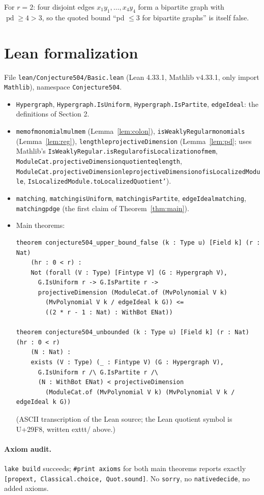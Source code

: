 \documentclass[11pt]{article}
\theoremstyle{definition}
\theoremstyle{remark}
\renewcommand{\_}{\oldus\allowbreak}
\newcommand{\pd}{\operatorname{pd}}
\begin{document}
For $r=2$: four disjoint edges $x_1y_1,\dots,x_4y_4$ form a bipartite graph with $\pd\ge 4>3$, so
the quoted bound ``pd $\le 3$ for bipartite graphs'' is itself false.

\section{Lean formalization}

File \texttt{lean/Conjecture504/Basic.lean} (Lean 4.33.1, Mathlib v4.33.1, only import
\texttt{Mathlib}), namespace \texttt{Conjecture504}.
\begin{itemize}[nosep]
\item \texttt{Hypergraph}, \texttt{Hypergraph.IsUniform}, \texttt{Hypergraph.IsPartite},
  \texttt{edgeIdeal}: the definitions of Section 2.
\item \texttt{mem\_of\_monomial\_mul\_mem} (Lemma~\ref{lem:colon}),
  \texttt{isWeaklyRegular\_monomials} (Lemma~\ref{lem:reg}),
  \texttt{length\_le\_projectiveDimension} (Lemma~\ref{lem:pd}; uses Mathlib's
  \texttt{IsWeaklyRegular.isRegular\_of\_isLocalization\_of\_mem},
  \texttt{ModuleCat.projectiveDimension\_quotient\_eq\_length},
  \texttt{ModuleCat.projectiveDimension\_le\_projectiveDimension\_of\_isLocalizedModule},
  \texttt{IsLocalizedModule.toLocalizedQuotient'}).
\item \texttt{matching}, \texttt{matching\_isUniform}, \texttt{matching\_isPartite},
  \texttt{edgeIdeal\_matching}, \texttt{matching\_pd\_ge} (the first claim of
  Theorem~\ref{thm:main}).
\item Main theorems:
\begin{verbatim}
theorem conjecture504_upper_bound_false (k : Type u) [Field k] (r : Nat)
    (hr : 0 < r) :
    Not (forall (V : Type) [Fintype V] (G : Hypergraph V),
      G.IsUniform r -> G.IsPartite r ->
      projectiveDimension (ModuleCat.of (MvPolynomial V k)
        (MvPolynomial V k / edgeIdeal k G)) <=
        ((2 * r - 1 : Nat) : WithBot ENat))

theorem conjecture504_unbounded (k : Type u) [Field k] (r : Nat) (hr : 0 < r)
    (N : Nat) :
    exists (V : Type) (_ : Fintype V) (G : Hypergraph V),
      G.IsUniform r /\ G.IsPartite r /\
      (N : WithBot ENat) < projectiveDimension
        (ModuleCat.of (MvPolynomial V k) (MvPolynomial V k / edgeIdeal k G))
\end{verbatim}
(ASCII transcription of the Lean source; the Lean quotient symbol is U+29F8, written 	exttt{/} above.)
\end{itemize}
\paragraph{Axiom audit.} \texttt{lake build} succeeds; \texttt{\#print axioms} for both main
theorems reports exactly \texttt{[propext, Classical.choice, Quot.sound]}. No \texttt{sorry}, no
\texttt{native\_decide}, no added axioms.
\end{document}
